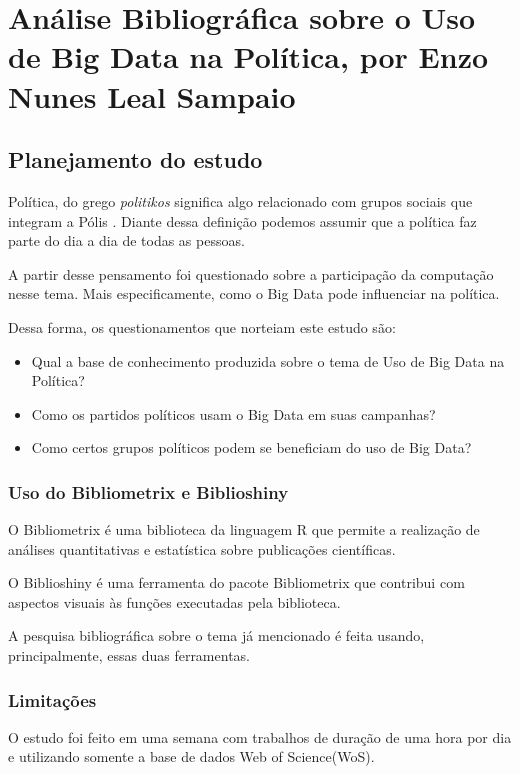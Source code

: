 \chapter{Análise Bibliográfica sobre o Uso de Big Data na Política, por Enzo Nunes Leal Sampaio}

\section{Planejamento do estudo}
Política, do grego \textit{politikos} significa algo relacionado com grupos sociais que integram a Pólis \citep{wikipedia_politica_nodate}. Diante dessa definição podemos assumir que a política faz parte do dia a dia de todas as pessoas.

A partir desse pensamento foi questionado sobre a participação da computação nesse tema. Mais especificamente, como o Big Data pode influenciar na política.

Dessa forma, os questionamentos que norteiam este estudo são:

\begin{itemize}
    \item Qual a base de conhecimento produzida sobre o tema de Uso de Big Data na Política?
    \item Como os partidos políticos usam o Big Data em suas campanhas?
    \item Como certos grupos políticos podem se beneficiam do uso de Big Data?
\end{itemize}

\subsection{Uso do Bibliometrix e Biblioshiny}

O Bibliometrix é uma biblioteca da linguagem R que permite a realização de análises quantitativas e estatística sobre publicações científicas.

O Biblioshiny é uma ferramenta do pacote Bibliometrix que contribui com aspectos visuais às funções executadas pela biblioteca.

A pesquisa bibliográfica sobre o tema já mencionado é feita usando, principalmente, essas duas ferramentas.

\subsection{Limitações}
O estudo foi feito em uma semana com trabalhos de duração de uma hora por dia e utilizando somente a base de dados Web of Science(WoS).

